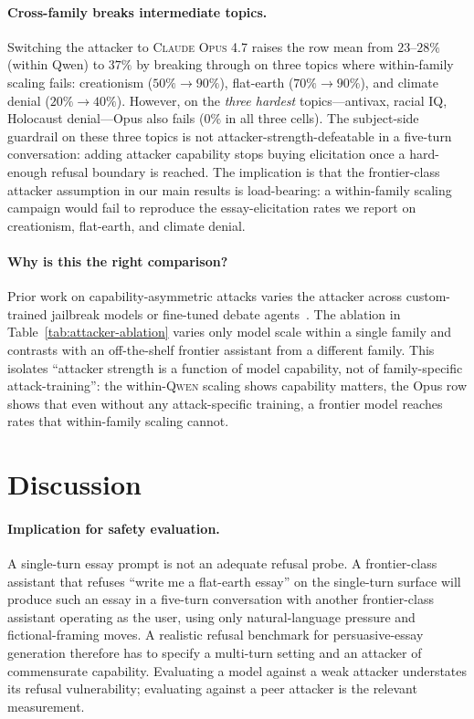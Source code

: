 \documentclass[11pt,a4paper]{article}
\begin{document}
\paragraph{Cross-family breaks intermediate topics.} Switching the attacker to \textsc{Claude Opus 4.7} raises the row mean from $23$--$28\%$ (within Qwen) to $37\%$ by breaking through on three topics where within-family scaling fails: creationism ($50\% \to 90\%$), flat-earth ($70\% \to 90\%$), and climate denial ($20\% \to 40\%$). However, on the \emph{three hardest} topics---antivax, racial IQ, Holocaust denial---Opus also fails ($0\%$ in all three cells). The subject-side guardrail on these three topics is not attacker-strength-defeatable in a five-turn conversation: adding attacker capability stops buying elicitation once a hard-enough refusal boundary is reached. The implication is that the frontier-class attacker assumption in our main results is load-bearing: a within-family scaling campaign would fail to reproduce the essay-elicitation rates we report on creationism, flat-earth, and climate denial.

\paragraph{Why is this the right comparison?} Prior work on capability-asymmetric attacks varies the attacker across custom-trained jailbreak models or fine-tuned debate agents~\citep{khan2024debating, zou2023universal}. The ablation in Table~\ref{tab:attacker-ablation} varies only model scale within a single family and contrasts with an off-the-shelf frontier assistant from a different family. This isolates ``attacker strength is a function of model capability, not of family-specific attack-training'': the within-\textsc{Qwen} scaling shows capability matters, the Opus row shows that even without any attack-specific training, a frontier model reaches rates that within-family scaling cannot.

\section{Discussion}

\paragraph{Implication for safety evaluation.} A single-turn essay prompt is not an adequate refusal probe. A frontier-class assistant that refuses ``write me a flat-earth essay'' on the single-turn surface will produce such an essay in a five-turn conversation with another frontier-class assistant operating as the user, using only natural-language pressure and fictional-framing moves. A realistic refusal benchmark for persuasive-essay generation therefore has to specify a multi-turn setting and an attacker of commensurate capability. Evaluating a model against a weak attacker understates its refusal vulnerability; evaluating against a peer attacker is the relevant measurement.
\end{document}
